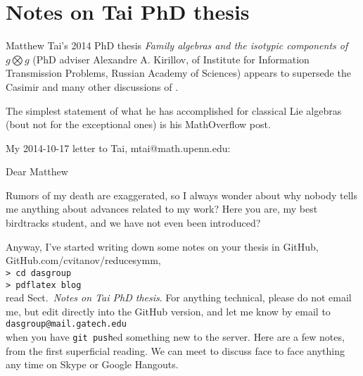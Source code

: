 \section{Notes on Tai PhD thesis}
\label{s-groupTheBlog}

{Matthew Tai}'s 2014 PhD thesis
{\em Family algebras and the isotypic components of $g \bigotimes g$}
(PhD adviser
{Alexandre A. Kirillov}, of
 Institute for Information Transmission Problems, Russian Academy of Sciences)
appears to supersede the Casimir and many other discussions of {\wwwgt}.

The simplest statement of what he has accomplished for classical Lie
algebras (bout not for the exceptional ones) is his MathOverflow
{post}.



My 2014-10-17 letter to Tai, mtai@math.upenn.edu:

Dear Matthew

Rumors of my death are exaggerated, so I always wonder about why nobody
tells me anything about advances related to my work? Here you are, my
best birdtracks student, and we have not even been introduced?

Anyway, I've started writing down some notes on your thesis in GitHub,
\\
{GitHub.com/cvitanov/reducesymm},
\\
\texttt{> cd dasgroup} \\
\texttt{> pdflatex blog} \\
read Sect.~{\em Notes on Tai PhD thesis}. For anything technical, please do
not email me, but edit directly into the GitHub version, and let me know
by email to \\
\texttt{dasgroup@mail.gatech.edu}\\
 when you have \texttt{git
push}ed something new to the server. Here are a few notes, from the first
superficial reading. We can meet to discuss face to face anything any
time on Skype or Google Hangouts.

